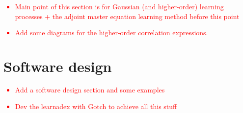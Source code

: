 \textcolor{red}{
\begin{itemize}
\item{Main point of this section is for Gaussian (and higher-order) learning processes + the adjoint master equation learning method before this point}
\item{Add some diagrams for the higher-order correlation expressions.}
\end{itemize}
}

\section{\sffamily Software design}

\textcolor{red}{
\begin{itemize}
\item{Add a software design section and some examples} 
\item{Dev the learnadex with Gotch to achieve all this stuff}
\end{itemize}
}

    